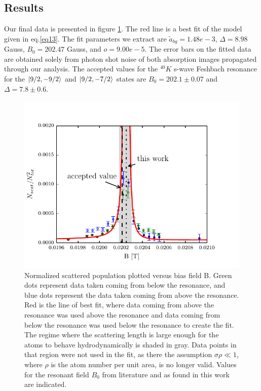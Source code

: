 \documentclass[12pt]{iopart}
\begin{document}
\subsection{Results}
Our final data is presented in figure \ref{fig:fittedFractions}. The red line is a best fit of the model given in eq.\ref{eq13}. The fit parameters we extract are $\tilde{a}_{bg}=1.48e-3$, $\Delta = 8.98$ Gauss, $B_0 = 202.47$ Gauss, and $o=9.00e-5$. The error bars on the fitted data are obtained solely from photon shot noise of both absorption images propagated through our analysis.
The accepted values for the $^{40}K$ s-wave Feshbach resonance for the  $\mathinner{|{9/2,-9/2}\rangle}$ and $\mathinner{|{9/2,-7/2}\rangle}$ states are $B_0=202.1\pm0.07$ and $\Delta=7.8\pm0.6$. 
\begin{figure}
	\includegraphics{figure11.pdf}
\caption{Normalized scattered population plotted versus bias field B. Green dots represent data taken coming from below the resonance, and blue dots represent the data taken coming from above the resonance. Red is the line of best fit, where data coming from above the resonance was used above the resonance and data coming from below the resonance was used below the resonance to create the fit. The regime where the scattering length is large enough for the atoms to behave hydrodynamically is shaded in gray. Data points in that region were not used in the fit, as there the assumption $\sigma\rho\ll1$, where $\rho$ is the atom number per unit area, is no longer valid. Values for the resonant field $B_0$ from literature and as found in this work are indicated.    }  
\label{fig:fittedFractions}
\end{figure}
\end{document}
